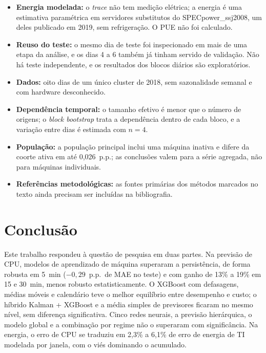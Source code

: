 \documentclass[a4paper,12pt]{article}
\begin{document}
\begin{itemize}
    \item \textbf{Energia modelada:} o \textit{trace} não tem medição elétrica; a energia é uma estimativa paramétrica em servidores substitutos do SPECpower\_ssj2008, um deles publicado em 2019, sem refrigeração. O PUE não foi calculado.
    \item \textbf{Reuso do teste:} o mesmo dia de teste foi inspecionado em mais de uma etapa da análise, e os dias 4 a 6 também já tinham servido de validação. Não há teste independente, e os resultados dos blocos diários são exploratórios.
    \item \textbf{Dados:} oito dias de um único cluster de 2018, sem sazonalidade semanal e com hardware desconhecido.
    \item \textbf{Dependência temporal:} o tamanho efetivo é menor que o número de origens; o \textit{block bootstrap} trata a dependência dentro de cada bloco, e a variação entre dias é estimada com $n = 4$.
    \item \textbf{População:} a população principal inclui uma máquina inativa e difere da coorte ativa em até 0,026~p.p.; as conclusões valem para a série agregada, não para máquinas individuais.
    \item \textbf{Referências metodológicas:} as fontes primárias dos métodos marcados no texto ainda precisam ser incluídas na bibliografia.
\end{itemize}


\section{Conclusão}
\label{sec:conclusao}

Este trabalho respondeu à questão de pesquisa em duas partes. Na previsão de CPU, modelos de aprendizado de máquina superaram a persistência, de forma robusta em 5~min ($-0{,}29$~p.p.\ de MAE no teste) e com ganho de 13\% a 19\% em 15 e 30~min, menos robusto estatisticamente. O XGBoost com defasagens, médias móveis e calendário teve o melhor equilíbrio entre desempenho e custo; o híbrido Kalman + XGBoost e a média simples de previsores ficaram no mesmo nível, sem diferença significativa. Cinco redes neurais, a previsão hierárquica, o modelo global e a combinação por regime não o superaram com significância. Na energia, o erro de CPU se traduziu em 2,3\% a 6,1\% de erro de energia de TI modelada por janela, com o viés dominando o acumulado.
\end{document}
